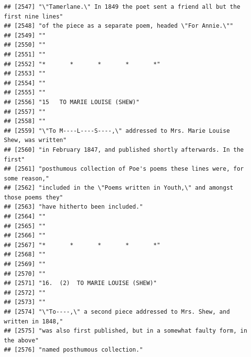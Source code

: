\documentclass{article}\usepackage[]{graphicx}\usepackage[]{color}
\makeatletter
\newenvironment{kframe}{%
 \def\at@end@of@kframe{}%
 \ifinner\ifhmode%
  \def\at@end@of@kframe{\end{minipage}}%
  \begin{minipage}{\columnwidth}%
 \fi\fi%
 \def\FrameCommand##1{\hskip\@totalleftmargin \hskip-\fboxsep
 \colorbox{shadecolor}{##1}\hskip-\fboxsep
     \hskip-\linewidth \hskip-\@totalleftmargin \hskip\columnwidth}%
 \MakeFramed {\advance\hsize-\width
   \@totalleftmargin\z@ \linewidth\hsize
   \@setminipage}}%
 {\par\unskip\endMakeFramed%
 \at@end@of@kframe}
\newenvironment{knitrout}{}{} %
\makeatother
\begin{document}
\begin{knitrout}
\begin{kframe}
\begin{verbatim}
## [2547] "\"Tamerlane.\" In 1849 the poet sent a friend all but the first nine lines"  
## [2548] "of the piece as a separate poem, headed \"For Annie.\""                      
## [2549] ""                                                                            
## [2550] ""                                                                            
## [2551] ""                                                                            
## [2552] "*       *       *       *       *"                                           
## [2553] ""                                                                            
## [2554] ""                                                                            
## [2555] ""                                                                            
## [2556] "15   TO MARIE LOUISE (SHEW)"                                                 
## [2557] ""                                                                            
## [2558] ""                                                                            
## [2559] "\"To M----L----S----,\" addressed to Mrs. Marie Louise Shew, was written"    
## [2560] "in February 1847, and published shortly afterwards. In the first"            
## [2561] "posthumous collection of Poe's poems these lines were, for some reason,"     
## [2562] "included in the \"Poems written in Youth,\" and amongst those poems they"    
## [2563] "have hitherto been included."                                                
## [2564] ""                                                                            
## [2565] ""                                                                            
## [2566] ""                                                                            
## [2567] "*       *       *       *       *"                                           
## [2568] ""                                                                            
## [2569] ""                                                                            
## [2570] ""                                                                            
## [2571] "16.  (2)  TO MARIE LOUISE (SHEW)"                                            
## [2572] ""                                                                            
## [2573] ""                                                                            
## [2574] "\"To----,\" a second piece addressed to Mrs. Shew, and written in 1848,"     
## [2575] "was also first published, but in a somewhat faulty form, in the above"       
## [2576] "named posthumous collection."                                                

\end{verbatim}
\end{kframe}
\end{knitrout}
\end{document}

